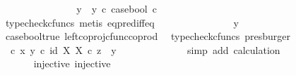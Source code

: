 \begin{isabellebody}
\ \ \ \ \ \ \ \ \ \ \isamarkupfalse%
\ \isamarkupfalse%
\ {\isachardoublequoteopen}{\isachardot}{\kern0pt}{\isachardot}{\kern0pt}{\isachardot}{\kern0pt}\ {\isacharequal}{\kern0pt}\ {\isacharparenleft}{\kern0pt}y{}\ {\isasymamalg}\ y{}{\isacharparenright}{\kern0pt}\ {\isasymcirc}\isactrlsub c\ case{\isacharunderscore}{\kern0pt}bool\ {\isasymcirc}\isactrlsub c\ {\isasymt}{\isachardoublequoteclose}\isanewline
\ \ \ \ \ \ \ \ \ \ \ \ \isamarkupfalse%
\ {\isacharparenleft}{\kern0pt}typecheck{\isacharunderscore}{\kern0pt}cfuncs{\isacharcomma}{\kern0pt}\ metis\ eq{\isacharunderscore}{\kern0pt}pred{\isacharunderscore}{\kern0pt}iff{\isacharunderscore}{\kern0pt}eq{\isacharparenright}{\kern0pt}\isanewline
\ \ \ \ \ \ \ \ \ \ \isamarkupfalse%
\ \isamarkupfalse%
\ {\isachardoublequoteopen}{\isachardot}{\kern0pt}{\isachardot}{\kern0pt}{\isachardot}{\kern0pt}\ {\isacharequal}{\kern0pt}\ y{}{\isachardoublequoteclose}\isanewline
\ \ \ \ \ \ \ \ \ \ \ \ \isamarkupfalse%
\ case{\isacharunderscore}{\kern0pt}bool{\isacharunderscore}{\kern0pt}true\ left{\isacharunderscore}{\kern0pt}coproj{\isacharunderscore}{\kern0pt}cfunc{\isacharunderscore}{\kern0pt}coprod\ \isamarkupfalse%
\ {\isacharparenleft}{\kern0pt}typecheck{\isacharunderscore}{\kern0pt}cfuncs{\isacharcomma}{\kern0pt}\ presburger{\isacharparenright}{\kern0pt}\isanewline
\ \ \ \ \ \ \ \ \ \ \isamarkupfalse%
\ \isamarkupfalse%
\ {\isachardoublequoteopen}{\isacharparenleft}{\kern0pt}{\isasymTheta}\ {\isasymcirc}\isactrlsub c\ {\isasymlangle}x{\isacharcomma}{\kern0pt}\ y{}{\isasymrangle}{\isacharparenright}{\kern0pt}\isactrlsup {\isasymflat}\ {\isasymcirc}\isactrlsub c\ {\isasymlangle}id\ X{\isacharcomma}{\kern0pt}\ {\isasymbeta}\isactrlbsub X\isactrlesub {\isasymrangle}\ {\isasymcirc}\isactrlsub c\ z\ {\isacharequal}{\kern0pt}\ y{}{\isachardoublequoteclose}\isanewline
\ \ \ \ \ \ \ \ \ \ \ \ \isamarkupfalse%
\ {\isacharparenleft}{\kern0pt}simp\ add{\isacharcolon}{\kern0pt}\ calculation{\isacharparenright}{\kern0pt}\isanewline
\ \ \ \ \ \ \ \ \isamarkupfalse%
\isanewline
\ \ \isanewline
\ \ \ \ \ \isamarkupfalse%
\ {\isasymTheta}{\isacharunderscore}{\kern0pt}injective{\isacharcolon}{\kern0pt}\ {\isachardoublequoteopen}injective{\isacharparenleft}{\kern0pt}{\isasymTheta}{\isacharparenright}{\kern0pt}{\isachardoublequoteclose}\isanewline
\ \ \ \ \ \isamarkupfalse%

\end{isabellebody}
